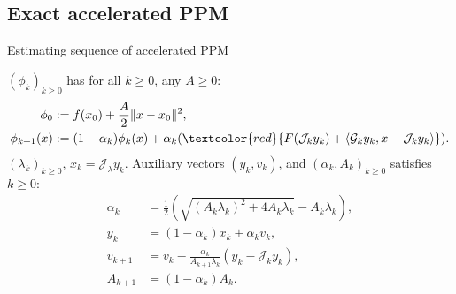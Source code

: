 \documentclass[11pt]{beamer}
\begin{document}
    \subsection{Exact accelerated PPM}
        \begin{frame}{Estimating sequence of accelerated PPM}
            \begin{definition}
                {\small
                    \label{def:nes-est-seq-acc-ppm}
                    $(\phi_k)_{k \ge0}$ has for all $k \ge0$, any $A \ge 0$: 
                    \begin{align*}
                        \phi_0 &:= f(x_0) + \frac{A}{2}\Vert x - x_0\Vert^2, 
                        \\
                        \phi_{k + 1}(x) &:= 
                        (1 - \alpha_k)\phi_k(x)
                        + 
                        \alpha_k(
                            \textcolor{red}
                            {
                                F(\mathcal J_k y_k) + \langle \mathcal G_k y_k, x - \mathcal J_k y_k\rangle
                            }
                        ).    
                    \end{align*}
                    $(\lambda_k)_{k \ge 0}$, $x_k = \mathcal J_\lambda y_k$. 
                    Auxiliary vectors $(y_k, v_k)$, and $(\alpha_k, A_k)_{k\ge 0}$ satisfies $k\ge0$:
                    \begin{align*}
                        \alpha_k &= \frac{1}{2}\left(
                            \sqrt{(A_k\lambda_k)^2 + 4A_k \lambda_k}
                            - A_k\lambda_k
                        \right), 
                        \\
                        y_k &= (1 - \alpha_k)x_k + \alpha_k v_k, 
                        \\
                        v_{k + 1}
                        &= 
                        v_k - \frac{\alpha_k}{A_{k + 1}\lambda_k}(y_k - \mathcal J_k y_k), 
                        \\
                        A_{k + 1} &= (1 - \alpha_k)A_k. 
                    \end{align*}
                }
            \end{definition}
        \end{frame}
\end{document}
